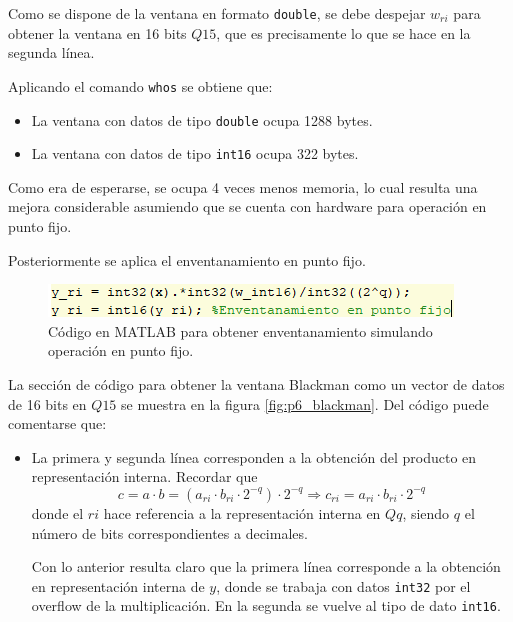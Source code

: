 \begin{enumerate}[a)]
\begin{itemize}
        Como se dispone de la ventana en formato \texttt{double}, se debe despejar $w_{ri}$ para obtener la ventana en 16 bits $Q15$, que es precisamente lo que se hace en la segunda línea. 
    \end{itemize}
    
    Aplicando el comando \texttt{whos} se obtiene que:
    \begin{itemize}
        \item La ventana con datos de tipo \texttt{double} ocupa 1288 bytes.
        \item La ventana con datos de tipo \texttt{int16} ocupa 322 bytes.
    \end{itemize}
    
    Como era de esperarse, se ocupa 4 veces menos memoria, lo cual resulta una mejora considerable asumiendo que se cuenta con hardware para operación en punto fijo.
    
    Posteriormente se aplica el enventanamiento en punto fijo.
    
    \begin{figure}[H]
        \centering
        \includegraphics{imagenes2/p6_pond.png}
        \caption{Código en MATLAB para obtener enventanamiento simulando operación en punto fijo.}
        \label{fig:p6_pond}
    \end{figure}
    
    La sección de código para obtener la ventana Blackman como un vector de datos de 16 bits en $Q15$ se muestra en la figura \ref{fig:p6_blackman}. Del código puede comentarse que:
    
    \begin{itemize}
        \item La primera y segunda línea corresponden a la obtención del producto en representación interna. Recordar que
        $$ c = a\cdot b = (a_{ri}\cdot b_{ri}\cdot 2^{-q})\cdot 2^{-q}\Rightarrow c_{ri} = a_{ri}\cdot b_{ri}\cdot 2^{-q}$$
        donde el $ri$ hace referencia a la representación interna en $Qq$, siendo $q$ el número de bits correspondientes a decimales.
        
        Con lo anterior resulta claro que la primera línea corresponde a la obtención en representación interna de $y$, donde se trabaja con datos \texttt{int32} por el overflow de la multiplicación. En la segunda se vuelve al tipo de dato \texttt{int16}. 
    \end{itemize}
    

\end{enumerate}
